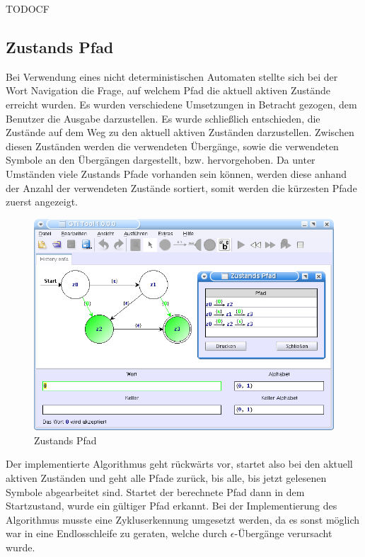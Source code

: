 TODOCF


\subsection{Zustands Pfad}

Bei Verwendung eines nicht deterministischen Automaten stellte sich bei der
Wort Navigation die Frage, auf welchem Pfad die aktuell aktiven Zustände
erreicht wurden. Es wurden verschiedene Umsetzungen in Betracht gezogen, dem
Benutzer die Ausgabe darzustellen. Es wurde schließlich entschieden, die
Zustände auf dem Weg zu den aktuell aktiven Zuständen darzustellen. Zwischen
diesen Zuständen werden die verwendeten Übergänge, sowie die verwendeten
Symbole an den Übergängen dargestellt, bzw. hervorgehoben. Da unter Umständen
viele Zustands Pfade vorhanden sein können, werden diese anhand der Anzahl der
verwendeten Zustände sortiert, somit werden die kürzesten Pfade zuerst
angezeigt.\vspace{10pt}

\begin{figure}[h!]
\begin{center}
\includegraphics[width=12cm]{../images/history_path.png}
\caption{Zustands Pfad}
\end{center}
\end{figure}

Der implementierte Algorithmus geht rückwärts vor, startet also bei den aktuell
aktiven Zuständen und geht alle Pfade zurück, bis alle, bis jetzt gelesenen
Symbole abgearbeitet sind. Startet der berechnete Pfad dann in dem
Startzustand, wurde ein gültiger Pfad erkannt. Bei der Implementierung des
Algorithmus musste eine Zykluserkennung umgesetzt werden, da es sonst möglich
war in eine Endlosschleife zu geraten, welche durch $\epsilon$-Übergänge
verursacht wurde.


